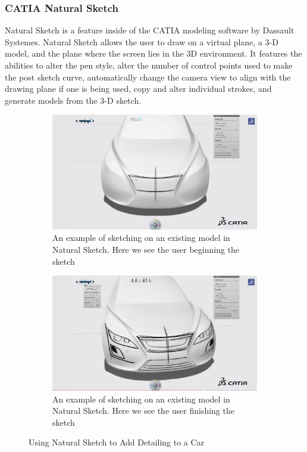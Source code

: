 \documentclass{article}
\begin{document}
\subsubsection{CATIA Natural Sketch}

Natural Sketch is a feature inside of the CATIA modeling software by Dassault Systemes. Natural Sketch allows the user to draw on a virtual plane, a 3-D model, and the plane where the screen lies in the 3D environment. It features the abilities to alter the pen style, alter the number of control points used to make the post sketch curve, automatically change the camera view to align with the drawing plane if one is being used, copy and alter individual strokes, and generate models from the 3-D sketch.

\begin{figure}

\begin{subfigure}{\textwidth}
\caption{An example of sketching on an existing model in Natural Sketch. Here we see the user beginning the sketch}
\includegraphics[width=\textwidth]{CATIA1}
\end{subfigure}
\begin{subfigure}{\textwidth}
\caption{An example of sketching on an existing model in Natural Sketch. Here we see the user finishing the sketch}
\includegraphics[width=\textwidth]{CATIA2}
\end{subfigure}

\caption{Using Natural Sketch to Add Detailing to a Car}
\end{figure}
\end{document}
